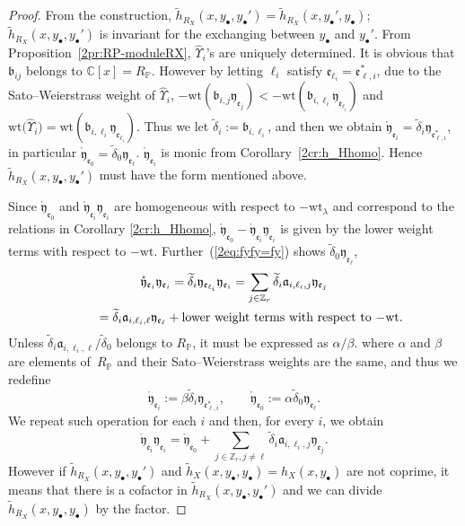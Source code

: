 \documentclass[pdftex]{sigma}
\def\CC{{\mathbb C}}
\def\ZZ{{\mathbb Z}}
\def\PP{{\mathbb P}}
\def\fa{{\mathfrak a}}
\def\fb{{\mathfrak b}}
\def\fe{{\mathfrak e}}
\def\fy{{\mathfrak y}}
\def\th{{\widetilde h}}
\def\tdelta{{\widetilde \delta}}
\def\hUpsilon{{\widehat \Upsilon}}
\def\rfy{{\mathring{\mathfrak y}}}
\def\wt{{\mathrm {wt}}}
\numberwithin{equation}{section}
\begin{document}
\begin{proof}From the construction, $\th_{R_X}(x, y_{\bullet}, y_{\bullet}')=\th_{R_X}(x, y_{\bullet}', y_{\bullet})$; $\th_{R_X}(x, y_{\bullet}, y_{\bullet}')$ is invariant for the exchanging between $y_{\bullet}$ and $y_{\bullet}'$.
From Proposition~\ref{2pr:RP-moduleRX}, $\hUpsilon_{i}$'s are uniquely determined.
It is obvious that $\fb_{i j}$ belongs to $\CC[x]=R_\PP$.
 However by letting $\ell_i$ satisfy
$\fe_{\ell_i}=\fe_{\ell,i}^*$, due to the Sato--Weierstrass weight of $\hUpsilon_{i}$, $-\wt(\fb_{i,j} \fy_{\fe_j}) < -\wt(\fb_{i,\ell_i} \fy_{\fe_{\ell_i}})$ and $\wt\big(\hUpsilon_{i}\big)=\wt(\fb_{i,\ell_i} \fy_{\fe_{\ell_i}})$.
Thus we let $\tdelta_i:=\fb_{i,\ell_i}$, and then we obtain $\rfy_{\fe_i}=\tdelta_i \fy_{\fe_{\ell,i}^*}$, in particular $\rfy_{\fe_0}=\tdelta_0 \fy_{\fe_\ell}$. $\rfy_{\fe_i}$ is monic from Corollary~\ref{2cr:h_Hhomo}.
Hence $\th_{R_X}(x, y_{\bullet}, y_{\bullet}')$ must have the form mentioned above.

Since $\rfy_{\fe_0}$ and $\rfy_{\fe_i}\fy_{\fe_i}$ are homogeneous with respect to $-\wt_\lambda$ and correspond to the relations in Corollary \ref{2cr:h_Hhomo}, $\rfy_{\fe_0}-\rfy_{\fe_i}\fy_{\fe_i}$ is given by the lower weight terms with respect to $-\wt$.
Further~(\ref{2eq:fyfy=fy}) shows $\tdelta_0 \fy_{\fe_\ell}$,
\begin{gather*}
\rfy_{\fe_i}\fy_{\fe_i} = \tdelta_i \fy_{\fe_{\ell_i}}\fy_{\fe_i}
=\sum_{j \in \ZZ_r} \tdelta_i \fa_{i, \ell_i, j}\fy_{\fe_j}\\
\hphantom{\rfy_{\fe_i}\fy_{\fe_i}}{} =\tdelta_i \fa_{i, \ell_i, \ell} \fy_{\fe_{\ell}} +\text{lower weight terms with respect to $-\wt$}.
\end{gather*}
Unless $\tdelta_i \fa_{i, \ell_i, \ell}/\tdelta_0$ belongs to $R_\PP$, it must be expressed as $\alpha/\beta$. where $\alpha$ and $\beta$ are elements of~$R_\PP$ and their Sato--Weierstrass weights are the same, and thus we redefine
\[
\rfy_{\fe_i}:=\beta \tdelta_i \fy_{\fe_{\ell,i}^*},
\qquad \rfy_{\fe_0}:=\alpha \tdelta_0 \fy_{\fe_\ell}.
\]
We repeat such operation for each $i$ and then, for every $i$, we obtain
\[
\rfy_{\fe_i}\fy_{\fe_i}
=\rfy_{\fe_0}+
\sum_{j \in \ZZ_r, j \neq \ell} \tdelta_i \fa_{i, \ell_i, j}\fy_{\fe_j}.
\]
However if $\th_{R_X}(x, y_{\bullet}, y_{\bullet}')$ and $\th_{X}(x, y_{\bullet}, y_{\bullet})=h_X(x, y_{\bullet})$ are not coprime, it means that there is a cofactor in $\th_{R_X}(x, y_{\bullet}, y_{\bullet}')$ and we can divide $\th_{R_X}(x, y_{\bullet}, y_{\bullet})$ by the factor.
\end{proof}
\end{document}
